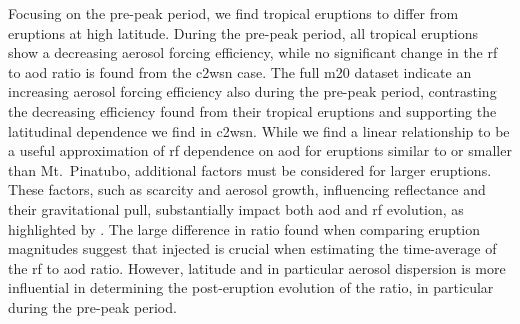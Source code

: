 \documentclass{ametsocV6.1}
\newcommand{\iso}[1][i]{{#1}njected \ce{SO2}}
\begin{document}
Focusing on the pre-peak period, we find tropical eruptions to differ from eruptions at
high latitude. During the pre-peak period, all tropical eruptions show a decreasing
aerosol forcing efficiency, while no significant change in the \gls{rf} to \gls{aod}
ratio is found from the \gls{c2wsn} case. The full \gls{m20} dataset indicate an
increasing aerosol forcing efficiency also during the pre-peak period, contrasting the
decreasing efficiency found from their tropical eruptions and supporting the latitudinal
dependence we find in \gls{c2wsn}. While we find a linear relationship to be a useful
approximation of \gls{rf} dependence on \gls{aod} for eruptions similar to or smaller
than Mt.\ Pinatubo, additional factors must be considered for larger eruptions.
These factors, such as  scarcity and aerosol growth, influencing reflectance and
their gravitational pull, substantially impact both \gls{aod} and \gls{rf} evolution, as
highlighted by \citet{timmreck2010}. The large difference in ratio found when comparing
eruption magnitudes suggest that \iso{} is crucial when estimating the time-average of
the \gls{rf} to \gls{aod} ratio. However, latitude and in particular aerosol dispersion
is more influential in determining the post-eruption evolution of the ratio, in
particular during the pre-peak period.
\end{document}
